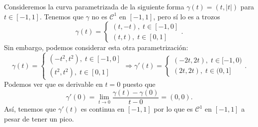 \begin{eg}
	Consideremos la curva parametrizada de la siguiente forma $\displaystyle \gamma\left(t\right)=\left(t, \left|t\right|\right) $ para $\displaystyle t \in \left[-1,1\right]  $. Tenemos que $\displaystyle \gamma  $ no es $\displaystyle \mathcal{C}^{1} $ en $\displaystyle \left[-1,1\right]  $, pero sí lo es a trozos
	\[\gamma\left(t\right) = 
	\begin{cases}
		\left(t, - t\right), \; t \in \left[-1,0\right] \\
		\left(t, t \right), \; t \in \left[0,1\right] 
	\end{cases}
	.\]
	Sin embargo, podemos considerar esta otra parametrización:
	\[\gamma\left(t\right)=
	\begin{cases}
		\left(-t ^{2}, t ^{2}\right), \; t \in \left[-1,0\right]  \\
		\left(t ^{2}, t ^{2}\right), \; t \in \left[0,1\right] 
	\end{cases}
	\Rightarrow \gamma'\left(t\right)=
	\begin{cases}
		\left(-2t, 2t\right), \; t \in [-1,0) \\
		\left(2t, 2t\right), \; t \in (0,1] 
	\end{cases}
	.\]
	Podemos ver que es derivable en $\displaystyle t = 0 $ puesto que 
	\[\gamma'\left(0\right)= \lim_{t \to 0}\frac{\gamma\left(t\right)-\gamma\left(0\right)}{t-0}=\left(0,0\right) .\]
	Así, tenemos que $\displaystyle \gamma'\left(t\right) $ es continua en $\displaystyle \left[-1,1\right]  $ por lo que es $\displaystyle \mathcal{C}^{1} $ en $\displaystyle \left[-1,1\right]  $ a pesar de tener un pico.
\end{eg}

